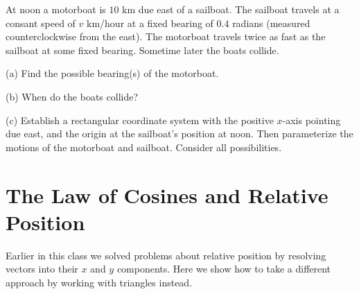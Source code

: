 \documentclass{ximera}
\begin{document}
\begin{question}  \label{Qercg663}
At noon a motorboat is $10$ km due east of a sailboat. The sailboat travels at a consant speed of $v$ km/hour at a fixed bearing of $0.4$ radians (measured counterclockwise from the east). The motorboat travels twice as fast as the sailboat at some fixed bearing. Sometime later the boats collide.

(a) Find the possible bearing(s) of the motorboat.

(b) When do the boats collide?

(c) Establish a rectangular coordinate system with the positive $x$-axis pointing due east, and the origin at the sailboat's position at noon. Then parameterize the motions of the motorboat and sailboat. Consider all possibilities.

\end{question}



\section{The Law of Cosines and Relative Position}
Earlier in this class we solved problems about relative position by resolving vectors into their $x$ and $y$ components. Here we show how to take a different approach by working with triangles instead.
\end{document}
